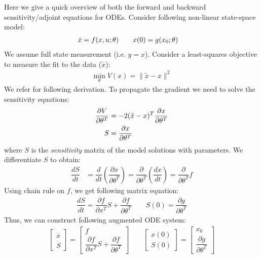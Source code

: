 \documentclass[fontsize=11pt]{article}
\newcommand{\norm}[1]{\lVert #1 \rVert}
\theoremstyle{definition}
\begin{document}
Here we give a quick overview of both the forward and backward sensitivity/adjoint 
equations for ODEs. Consider following non-linear state-space model:
\begin{align}
    \dot{x} &= f(x, u; \theta) \qquad x(0) = g(x_0; \theta)\notag 
    \label{eq:ssode}
\end{align}
We assume full state measurement (i.e. $y=x$). Consider a least-squares objective
to measure the fit to the data ($\tilde{x}$):
\begin{align}
    \min\limits_{\theta} V(x) = \norm{\tilde{x} - x}^2 
\end{align}
We refer \cite{rawlings:ekerdt:2020} for following derivation. To propagate the gradient we need to solve the sensitivity equations:
\begin{align}
    \dfrac{\partial V}{\partial \theta^T} &= -2 (\tilde{x} - x)^T \dfrac{\partial x}{\partial \theta^T} \notag \\ 
    S &= \dfrac{\partial x}{\partial \theta^T}
    \label{eq:sens}
\end{align}
where $S$ is the \textit{sensitivity} matrix of the model solutions with parameters. We differentiate $S$ to obtain:
\begin{align}
    \dfrac{d S}{dt} &= \dfrac{d}{dt} \left(\dfrac{\partial x}{\partial \theta^T}\right) =
    \dfrac{\partial}{\partial\theta^T} \left(\dfrac{d x}{dt}\right) = 
    \dfrac{\partial }{\partial \theta^T} f
\end{align}
Using chain rule on $f$, we get following matrix equation:
\begin{align}
    \dfrac{dS}{dt} = \dfrac{\partial f}{\partial x^T}S + \dfrac{\partial f}{\partial \theta^T} \qquad  S(0) = \dfrac{\partial g}{\partial \theta^T}
\end{align}
Thus, we can construct following augmented ODE system:
\begin{align}
    \begin{bmatrix} \dot{x} \\ \dot{S} \end{bmatrix} = 
    \begin{bmatrix} f \\ \dfrac{\partial f}{\partial x^T}S + \dfrac{\partial f}{\partial \theta^T} \end{bmatrix}
    \qquad
    \begin{bmatrix} x(0) \\ S(0) \end{bmatrix} =
    \begin{bmatrix} x_0 \\ \dfrac{\partial g}{\partial \theta^T} \end{bmatrix}
    \label{eq:augsensode}
\end{align}
\end{document}
